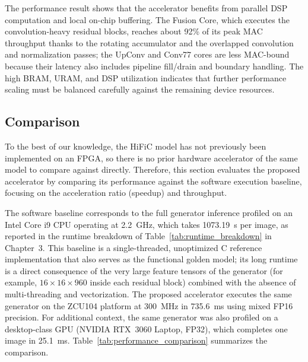 The performance result shows that the accelerator benefits from parallel DSP computation and local on-chip buffering. The Fusion Core, which executes the convolution-heavy residual blocks, reaches about 92\% of its peak MAC throughput thanks to the rotating accumulator and the overlapped convolution and normalization passes; the UpConv and Conv77 cores are less MAC-bound because their latency also includes pipeline fill/drain and boundary handling. The high BRAM, URAM, and DSP utilization indicates that further performance scaling must be balanced carefully against the remaining device resources.

\subsection{Comparison}

To the best of our knowledge, the HiFiC model has not previously been implemented on an FPGA, so there is no prior hardware accelerator of the same model to compare against directly. Therefore, this section evaluates the proposed accelerator by comparing its performance against the software execution baseline, focusing on the acceleration ratio (speedup) and throughput.

The software baseline corresponds to the full generator inference profiled on an Intel Core i9 CPU operating at 2.2~GHz, which takes 1073.19~s per image, as reported in the runtime breakdown of Table~\ref{tab:runtime_breakdown} in Chapter~3. This baseline is a single-threaded, unoptimized C reference implementation that also serves as the functional golden model; its long runtime is a direct consequence of the very large feature tensors of the generator (for example, $16\times16\times960$ inside each residual block) combined with the absence of multi-threading and vectorization. The proposed accelerator executes the same generator on the ZCU104 platform at 300~MHz in 735.6~ms using mixed FP16 precision. For additional context, the same generator was also profiled on a desktop-class GPU (NVIDIA RTX~3060 Laptop, FP32), which completes one image in 25.1~ms. Table~\ref{tab:performance_comparison} summarizes the comparison.

